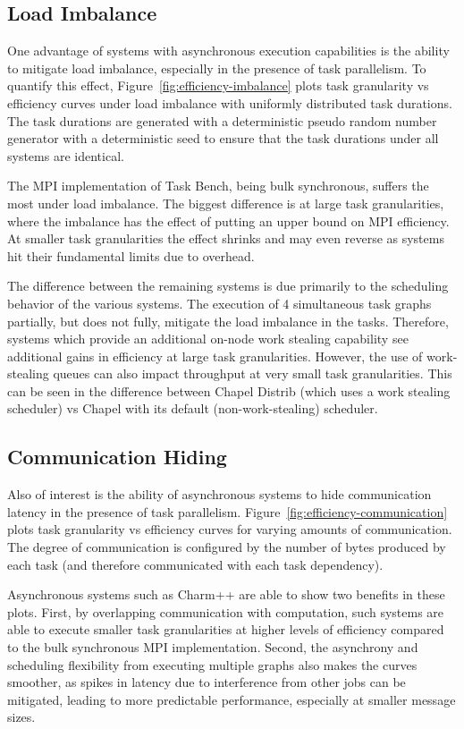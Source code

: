 \subsection{Load Imbalance}



One advantage of systems with asynchronous execution capabilities is
the ability to mitigate load imbalance, especially in the presence of
task parallelism. To quantify this effect,
Figure~\ref{fig:efficiency-imbalance} plots task granularity vs
efficiency curves under load imbalance with uniformly distributed task
durations. The task durations are generated with a deterministic
pseudo random number generator with a deterministic seed to ensure
that the task durations under all systems are identical.

The MPI implementation of Task Bench, being bulk synchronous,
suffers the most under load imbalance. The biggest
difference is at large task granularities, where the imbalance has the
effect of putting an upper bound on MPI efficiency. At smaller task
granularities the effect shrinks and may even reverse as systems hit
their fundamental limits due to overhead.

The difference between the remaining systems is due primarily to the
scheduling behavior of the various systems. The execution of 4
simultaneous task graphs partially, but does not fully, mitigate the
load imbalance in the tasks. Therefore, systems which provide an
additional on-node work stealing capability see additional gains in
efficiency at large task granularities. However, the use of
work-stealing queues can also impact throughput at very small task
granularities. This can be seen in the difference between Chapel
Distrib (which uses a work stealing scheduler) vs Chapel with its
default (non-work-stealing) scheduler.

\subsection{Communication Hiding}



Also of interest is the ability of asynchronous systems to
hide communication latency in the presence of task
parallelism. Figure~\ref{fig:efficiency-communication} plots task
granularity vs efficiency curves for varying amounts of
communication. The degree of communication is configured by the number
of bytes produced by each task (and therefore communicated with each
task dependency).

Asynchronous systems such as Charm++ are able to show two benefits in
these plots. First, by overlapping communication with computation,
such systems are able to execute smaller task granularities at higher
levels of efficiency compared to the bulk synchronous MPI
implementation. Second, the asynchrony and scheduling flexibility from
executing multiple graphs also makes the curves smoother,
as spikes in latency due to interference from other jobs can be
mitigated, leading to more predictable performance, especially at
smaller message sizes.

